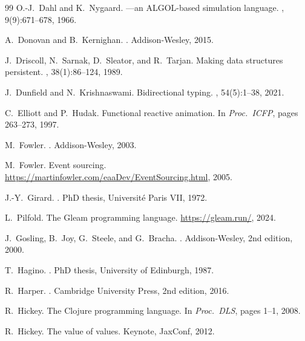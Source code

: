 \documentclass[11pt]{article}
\theoremstyle{definition}
\theoremstyle{remark}
\begin{document}
\begin{thebibliography}{99}
O.-J.~Dahl and K.~Nygaard.
---an {ALGOL}-based simulation language.
, 9(9):671--678, 1966.

A.~Donovan and B.~Kernighan.
.
\newblock Addison-Wesley, 2015.

J.~Driscoll, N.~Sarnak, D.~Sleator, and R.~Tarjan.
\newblock Making data structures persistent.
, 38(1):86--124, 1989.

J.~Dunfield and N.~Krishnaswami.
\newblock Bidirectional typing.
, 54(5):1--38, 2021.

C.~Elliott and P.~Hudak.
\newblock Functional reactive animation.
\newblock In {\em Proc.\ ICFP}, pages 263--273, 1997.

M.~Fowler.
.
\newblock Addison-Wesley, 2003.

M.~Fowler.
\newblock Event sourcing.
\newblock \url{https://martinfowler.com/eaaDev/EventSourcing.html}, 2005.

J.-Y.~Girard.
.
\newblock PhD thesis, Universit\'{e} Paris VII, 1972.

L.~Pilfold.
\newblock The {Gleam} programming language.
\newblock \url{https://gleam.run/}, 2024.

J.~Gosling, B.~Joy, G.~Steele, and G.~Bracha.
.
\newblock Addison-Wesley, 2nd edition, 2000.

T.~Hagino.
.
\newblock PhD thesis, University of Edinburgh, 1987.

R.~Harper.
.
\newblock Cambridge University Press, 2nd edition, 2016.

R.~Hickey.
\newblock The {Clojure} programming language.
\newblock In {\em Proc.\ DLS}, pages 1--1, 2008.

R.~Hickey.
\newblock The value of values.
\newblock Keynote, JaxConf, 2012.


\end{thebibliography}
\end{document}
